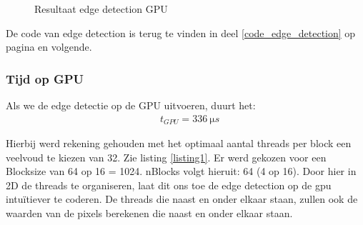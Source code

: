 \documentclass[11pt,twoside,a4paper]{article}
\begin{document}
\begin{figure}[h!]
    \centering
    \hfill
    \caption{Resultaat edge detection GPU}
    \label{fig:edge_dection}
\end{figure}



De code van edge detection is terug te vinden in deel \ref{code_edge_detection} op pagina \pageref{code_edge_detection} en volgende.


\subsubsection{Tijd op GPU}

Als we de edge detectie op de GPU uitvoeren, duurt het:
\begin{align*}
    &t_{GPU} = \SI{336}{\micro s}
\end{align*}

Hierbij werd rekening gehouden met het optimaal aantal threads per block een veelvoud te kiezen van 32. Zie listing \ref{listing1}. Er werd gekozen voor een Blocksize van 64 op 16 = 1024. nBlocks volgt hieruit: 64 (4 op 16). Door hier in 2D de threads te organiseren, laat dit ons toe de edge detection op de gpu intu\"itiever te coderen. De threads die naast en onder elkaar staan, zullen ook de waarden van de pixels berekenen die naast en onder elkaar staan.
\end{document}
